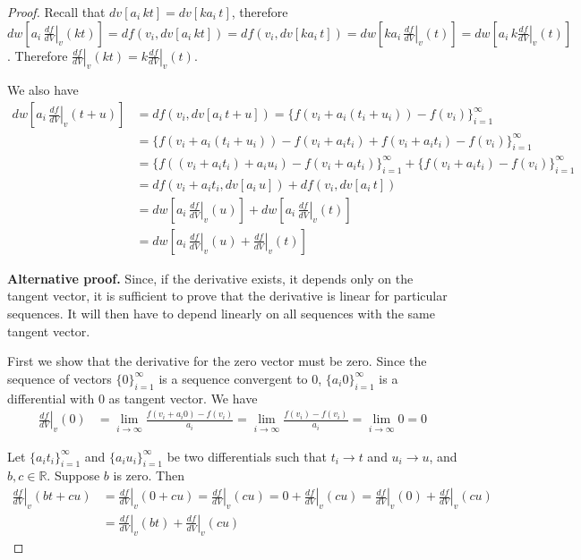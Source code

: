 \documentclass[11pt,letterpaper,fleqn]{memoir}
\begin{document}
\begin{proof}
	Recall that $dv[a_i \, kt] = dv[k a_i \, t]$, therefore $dw[a_i \, \left.\frac{df}{dV} \right|_{v} (kt)] = df(v_i, dv[a_i \, kt]) = df(v_i, dv[ka_i \, t]) = dw[ka_i \, \left.\frac{df}{dV} \right|_{v} (t)] = dw[a_i \, k \left.\frac{df}{dV} \right|_{v} (t)]$. Therefore $\left.\frac{df}{dV} \right|_{v} (kt) = k \left.\frac{df}{dV} \right|_{v} (t)$.
	
	We also have
	\begin{align*}
		dw[a_i \, \left.\frac{df}{dV} \right|_{v} (t+u)] &= df(v_i, dv[a_i \, t + u]) = \{f(v_i + a_i (t_i + u_i)) - f(v_i)\}_{i=1}^{\infty} \\
		&= \{f(v_i + a_i (t_i + u_i)) - f(v_i + a_i t_i) + f(v_i + a_i t_i) - f(v_i)\}_{i=1}^{\infty} \\
		&= \{f((v_i + a_i t_i) + a_i u_i) - f(v_i + a_i t_i)\}_{i=1}^{\infty} + \{f(v_i + a_i t_i) - f(v_i)\}_{i=1}^{\infty} \\
		&= df(v_i + a_i t_i, dv[a_i \, u]) + df(v_i, dv[a_i \, t]) \\
		&= dw[a_i \, \left.\frac{df}{dV} \right|_{v} (u)]+dw[a_i \, \left.\frac{df}{dV} \right|_{v} (t)] \\
		&= dw[a_i \, \left.\frac{df}{dV} \right|_{v} (u) + \left.\frac{df}{dV} \right|_{v} (t)]
	\end{align*}

	\textbf{Alternative proof.} Since, if the derivative exists, it depends only on the tangent vector, it is sufficient to prove that the derivative is linear for particular sequences. It will then have to depend linearly on all sequences with the same tangent vector.
	
	First we show that the derivative for the zero vector must be zero. Since the sequence of vectors $\{0\}_{i=1}^{\infty}$ is a sequence convergent to $0$, $\{a_i 0\}_{i=1}^{\infty}$ is a differential with $0$ as tangent vector. We have 
	\begin{align*}
	\left.\frac{df}{dV} \right|_{v} (0) &= \lim\limits_{i \to \infty} \frac{f(v_i + a_i 0) - f(v_i)}{a_i} 
	= \lim\limits_{i \to \infty} \frac{f(v_i ) - f(v_i)}{a_i} = \lim\limits_{i \to \infty} 0 = 0
	\end{align*}
	
	Let $\{a_i t_i\}_{i=1}^{\infty}$ and $\{a_i u_i\}_{i=1}^{\infty}$ be two differentials such that $t_i \to t$ and $u_i \to u$, and $b,c \in \mathbb{R}$. Suppose $b$ is zero. Then
	\begin{align*}		
	\left.\frac{df}{dV} \right|_{v} (b t + c u) &= \left.\frac{df}{dV} \right|_{v} (0 + c u) = \left.\frac{df}{dV} \right|_{v} (c u) = 0 + \left.\frac{df}{dV} \right|_{v} (c u) = \left.\frac{df}{dV} \right|_{v} (0) + \left.\frac{df}{dV} \right|_{v} (c u)  \\
	&= \left.\frac{df}{dV} \right|_{v} (b t) + \left.\frac{df}{dV} \right|_{v} (c u)
	\end{align*}
	

\end{proof}
\end{document}
